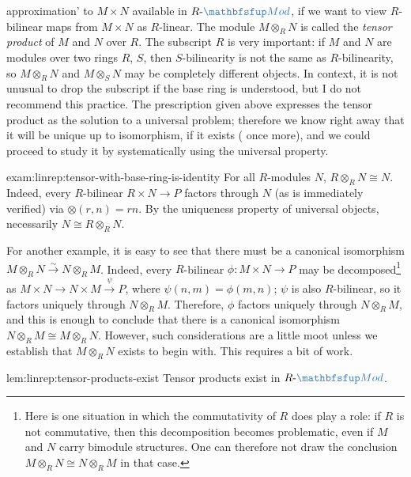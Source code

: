 approximation' to $M \times N$ available in $R\text{-}\categ{Mod}$, if
we want to view $R$-bilinear maps from $M \times N$ as $R$-linear. The
module $M \otimes_R N$ is called the \emph{tensor product} of $M$ and
$N$ over $R$. The subscript $R$ is very important: if $M$ and $N$ are
modules over two rings $R$, $S$, then $S$-bilinearity is not the same
as $R$-bilinearity, so $M \otimes_R N$ and $M \otimes_S N$ may be
completely different objects. In context, it is not unusual to drop
the subscript if the base ring is understood, but I do not recommend
this practice. The prescription given above expresses the tensor
product as the solution to a universal problem; therefore we know
right away that it will be unique up to isomorphism, if it exists
( once more), and we could
proceed to study it by systematically using the universal property.
\begin{exam}{}{exam:linrep:tensor-with-base-ring-is-identity}
  For all $R$-modules $N$, $R \otimes_R N \cong N$. Indeed, every
  $R$-bilinear $R \times N \to P$ factors through $N$ (as is
  immediately verified) via $\otimes(r, n) = rn$. By the uniqueness
  property of universal objects, necessarily $N \cong R \otimes_R N$.
\end{exam}
For another example, it is easy to see that there must be a canonical
isomorphism $M \otimes_R N \xrightarrow{\sim} N \otimes_R M$. Indeed,
every $R$-bilinear $\phi : M \times N \to P$ may be
decomposed\footnote{Here is one situation in which the commutativity
  of $R$ does play a role: if $R$ is not commutative, then this
  decomposition becomes problematic, even if $M$ and $N$ carry
  bimodule structures. One can therefore not draw the conclusion
  $M \otimes_R N \cong N \otimes_R M$ in that case.} as
$M \times N \to N \times M \xrightarrow{\psi} P$, where
$\psi(n, m) = \phi(m, n)$; $\psi$ is also $R$-bilinear, so it factors
uniquely through $N \otimes_R M$. Therefore, $\phi$ factors uniquely
through $N \otimes_R M$, and this is enough to conclude that there is
a canonical isomorphism $N \otimes_R M \cong M \otimes_R N$.  However,
such considerations are a little moot unless we establish that
$M \otimes_R N$ exists to begin with. This requires a bit of work.
\begin{lem}{}{lem:linrep:tensor-products-exist}%
  Tensor products exist in $R\text{-}\categ{Mod}$.
\end{lem}

